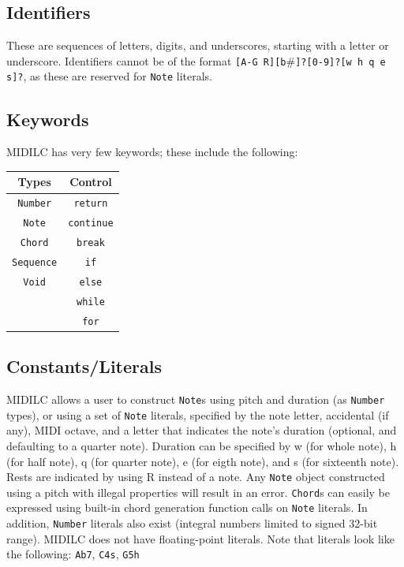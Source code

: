 \documentclass[12pt,A4]{book}
\begin{document}
\subsection{Identifiers}
These are sequences of letters, digits, and underscores, starting with a letter or underscore.  Identifiers cannot be of the format \verb|[A-G R][b|\#\verb|]?[0-9]?[w h q e s]?|, as these are reserved for \verb|Note| literals.
\subsection{Keywords}
MIDILC has very few keywords; these include the following:

\begin{tabular}{|c|c|}
\hline
Types & Control \\ \hline
\verb|Number| & \verb|return| \\ \hline
\verb|Note|	& \verb|continue| \\ \hline
\verb|Chord| & \verb|break| \\ \hline
\verb|Sequence|	& \verb|if| \\ \hline
\verb|Void|	& \verb|else| \\ \hline
	& \verb|while| \\ \hline
	& \verb|for| \\ \hline
\end{tabular}


\subsection{Constants/Literals}
MIDILC allows a user to construct \verb|Note|s using pitch and duration (as \verb|Number| types), or using a set of \verb|Note| literals, specified by the note letter, accidental (if any), MIDI octave, and a letter that indicates the note’s duration (optional, and defaulting to a quarter note).  Duration can be specified by w (for whole note), h (for half note), q (for quarter note), e (for eigth note), and s (for sixteenth note).  Rests are indicated by using R instead of a note. Any \verb|Note| object constructed using a pitch with illegal properties will result in an error. \verb|Chord|s can easily be expressed using built-in chord generation function calls on \verb|Note| literals.  In addition, \verb|Number| literals also exist (integral numbers limited to signed 32-bit range).  MIDILC does not have floating-point literals.
Note that literals look like the following:
\verb|Ab7|,
\verb|C4s|,
\verb|G5h|
\end{document}

